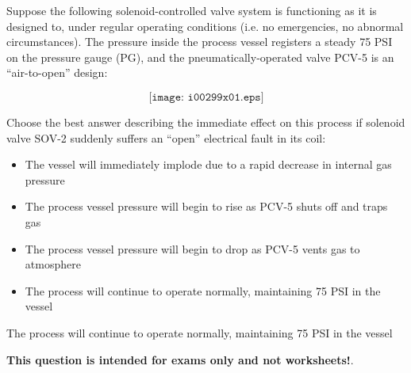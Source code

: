 

Suppose the following solenoid-controlled valve system is functioning as it is designed to, under regular operating conditions (i.e. no emergencies, no abnormal circumstances).  The pressure inside the process vessel registers a steady 75 PSI on the pressure gauge (PG), and the pneumatically-operated valve PCV-5 is an ``air-to-open'' design:

$$\texttt{[image: i00299x01.eps]}$$

\noindent
Choose the best answer describing the immediate effect on this process if solenoid valve SOV-2 suddenly suffers an ``open'' electrical fault in its coil:

\begin{itemize}
\item{} The vessel will immediately implode due to a rapid decrease in internal gas pressure
\vskip 10pt
\item{} The process vessel pressure will begin to rise as PCV-5 shuts off and traps gas
\vskip 10pt
\item{} The process vessel pressure will begin to drop as PCV-5 vents gas to atmosphere
\vskip 10pt
\item{} The process will continue to operate normally, maintaining 75 PSI in the vessel
\end{itemize}







The process will continue to operate normally, maintaining 75 PSI in the vessel







{\bf This question is intended for exams only and not worksheets!}.



